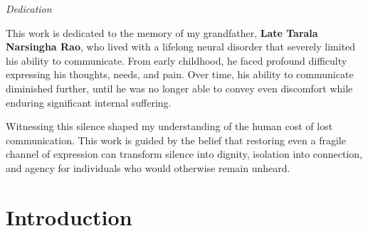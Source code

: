 \documentclass[11pt,a4paper]{article}
\begin{document}
\thispagestyle{empty}
\vspace*{\fill}
\begin{center}
  \begin{minipage}{0.78\linewidth}
    \begin{mdframed}[backgroundcolor=gray!4, linecolor=gray!35, linewidth=0.8pt,
                 innerleftmargin=18pt, innerrightmargin=18pt,
                 innertopmargin=16pt, innerbottommargin=16pt,
                 roundcorner=4pt]
      \begin{center}
        \textit{\large Dedication}\\[10pt]
      \end{center}
      \small\setlength{\parskip}{7pt}
      This work is dedicated to the memory of my grandfather,
      \textbf{Late Tarala Narsingha Rao}, who lived with a lifelong neural
      disorder that severely limited his ability to communicate. From early
      childhood, he faced profound difficulty expressing his thoughts, needs,
      and pain. Over time, his ability to communicate diminished further, until
      he was no longer able to convey even discomfort while enduring significant
      internal suffering.

      Witnessing this silence shaped my understanding of the human cost of lost
      communication. This work is guided by the belief that restoring even a
      fragile channel of expression can transform silence into dignity, isolation
      into connection, and agency for individuals who would otherwise remain
      unheard.
    \end{mdframed}
  \end{minipage}
\end{center}
\vspace*{\fill}
\newpage

\section{Introduction}
\end{document}
